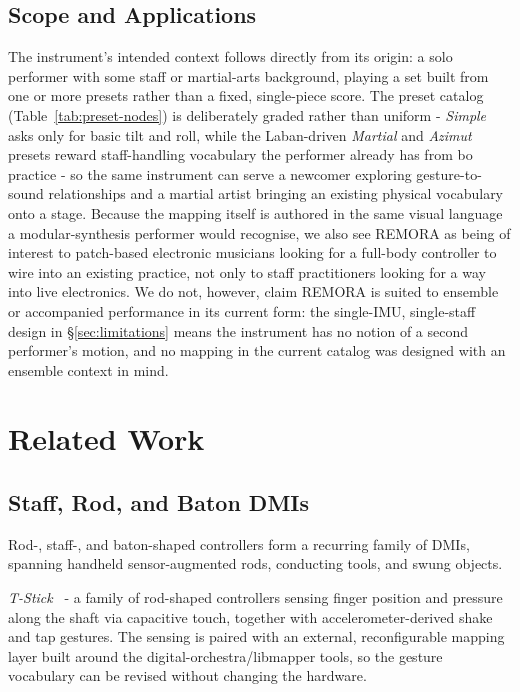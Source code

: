 \documentclass[sigconf,nonacm]{acmart}
\newcommand{\preset}[1]{\textit{#1}}
\begin{document}
\subsection{Scope and Applications}
The instrument's intended context follows directly from its origin: a solo performer with some
staff or martial-arts background, playing a set built from one or more presets rather than a fixed,
single-piece score. The preset catalog (Table~\ref{tab:preset-nodes}) is deliberately graded rather than uniform - \preset{Simple}
asks only for basic tilt and roll, while the Laban-driven \preset{Martial} and \preset{Azimut} presets reward
staff-handling vocabulary the performer already has from bo practice - so the same instrument can
serve a newcomer exploring gesture-to-sound relationships and a martial artist bringing an existing
physical vocabulary onto a stage. Because the mapping itself is authored in the same visual
language a modular-synthesis performer would recognise, we also see REMORA as being of interest to
patch-based electronic musicians looking for a full-body controller to wire into an existing
practice, not only to staff practitioners looking for a way into live electronics. We do not,
however, claim REMORA is suited to ensemble or accompanied performance in its current form: the
single-IMU, single-staff design in \S\ref{sec:limitations} means the instrument has no notion of a
second performer's motion, and no mapping in the current catalog was designed with an ensemble
context in mind.

\newpage
\section{Related Work}

\subsection{Staff, Rod, and Baton DMIs}
Rod-, staff-, and baton-shaped controllers form a recurring family of DMIs, spanning handheld
sensor-augmented rods, conducting tools, and swung objects.

\textit{T-Stick}~\cite{malloch2007tstick} - a family of rod-shaped controllers sensing finger
position and pressure along the shaft via capacitive touch, together with accelerometer-derived
shake and tap gestures. The sensing is paired with an external, reconfigurable mapping layer built
around the digital-orchestra/libmapper tools, so the gesture vocabulary can be revised without
changing the hardware.
\end{document}
